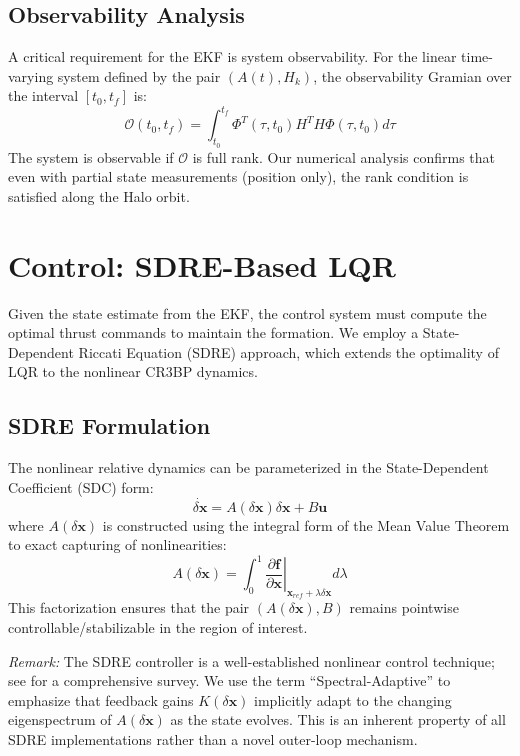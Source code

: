 \documentclass[10pt,letterpaper]{article}
\begin{document}
\subsection{Observability Analysis}
A critical requirement for the EKF is system observability. For the linear time-varying system defined by the pair $(A(t), H_k)$, the observability Gramian over the interval $[t_0, t_f]$ is:
\begin{equation}
    \mathcal{O}(t_0, t_f) = \int_{t_0}^{t_f} \Phi^T(\tau, t_0) H^T H \Phi(\tau, t_0) d\tau
\end{equation}
The system is observable if $\mathcal{O}$ is full rank. Our numerical analysis confirms that even with partial state measurements (position only), the rank condition is satisfied along the Halo orbit.

\section{Control: SDRE-Based LQR}

Given the state estimate from the EKF, the control system must compute the optimal thrust commands to maintain the formation. We employ a State-Dependent Riccati Equation (SDRE) approach, which extends the optimality of LQR to the nonlinear CR3BP dynamics.

\subsection{SDRE Formulation}
The nonlinear relative dynamics can be parameterized in the State-Dependent Coefficient (SDC) form:
\begin{equation}
    \dot{\delta \mathbf{x}} = A(\delta \mathbf{x}) \delta \mathbf{x} + B \mathbf{u}
\end{equation}
where $A(\delta \mathbf{x})$ is constructed using the integral form of the Mean Value Theorem to exact capturing of nonlinearities:
\begin{equation}
    A(\delta \mathbf{x}) = \int_0^1 \left. \frac{\partial \mathbf{f}}{\partial \mathbf{x}} \right|_{\mathbf{x}_{ref} + \lambda \delta \mathbf{x}} d\lambda
\end{equation}
This factorization ensures that the pair $(A(\delta \mathbf{x}), B)$ remains pointwise controllable/stabilizable in the region of interest.

\textit{Remark:} The SDRE controller is a well-established nonlinear control technique; see \cite{cimen2012sdre} for a comprehensive survey. We use the term ``Spectral-Adaptive'' to emphasize that feedback gains $K(\delta \mathbf{x})$ implicitly adapt to the changing eigenspectrum of $A(\delta \mathbf{x})$ as the state evolves. This is an inherent property of all SDRE implementations rather than a novel outer-loop mechanism.
\end{document}
